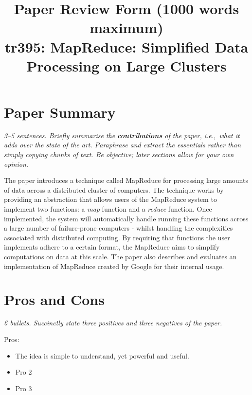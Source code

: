\documentclass[11pt]{article}
\begin{document}

\title{Paper Review Form (1000 words maximum)\\
    tr395: MapReduce: Simplified Data Processing on Large Clusters \cite{MapReduce}}

\maketitle

\section*{Paper Summary}

\textsl{3--5 sentences. Briefly summarise the {\bf contributions} of the paper,
i.e.,~what it adds over the state of the art. Paraphrase and extract the
essentials rather than simply copying chunks of text. Be objective; later
sections allow for your own opinion.}

The paper introduces a technique called MapReduce for processing large amounts
of data across a distributed cluster of computers. The technique works by
providing an abstraction that allows users of the MapReduce system to implement
two functions: a \textit{map} function and a \textit{reduce} function. Once
implemented, the system will automatically handle running these functions
across a large number of failure-prone computers - whilst handling the
complexities associated with distributed computing. By requiring that functions
the user implements adhere to a certain format, the MapReduce aims to simplify
computations on data at this scale. The paper also describes and evaluates an
implementation of MapReduce created by Google for their internal usage.


\section*{Pros and Cons}

\textsl{6 bullets. Succinctly state three positives and three negatives of the
paper.}

Pros:

\begin{itemize}

    \item The idea is simple to understand, yet powerful and useful.

    \item Pro 2

    \item Pro 3

\end{itemize}
\end{document}
